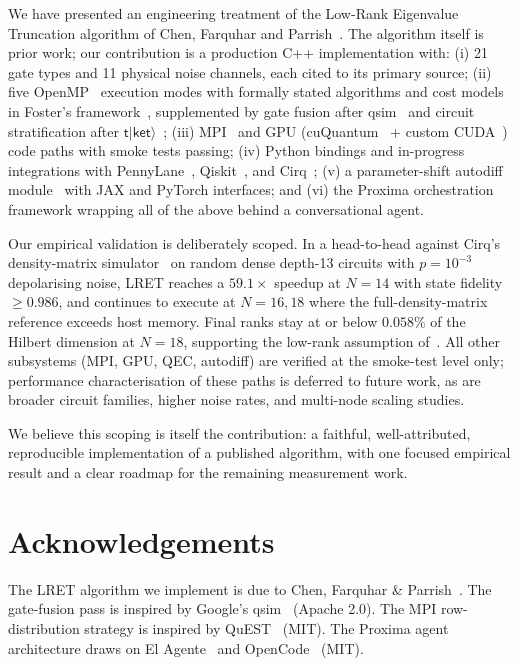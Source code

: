 \documentclass[11pt,a4paper]{article}
\begin{document}
We have presented an engineering treatment of the Low-Rank Eigenvalue Truncation
algorithm of Chen, Farquhar and Parrish~\cite{chen2021lret}. The algorithm itself is
prior work; our contribution is a production C++ implementation with:
(i) 21 gate types and 11 physical noise channels, each cited to its primary source;
(ii) five OpenMP~\cite{dagummenon1998} execution modes with formally stated
algorithms and cost models in Foster's framework~\cite{foster1995}, supplemented by
gate fusion after qsim~\cite{qsim} and circuit stratification after
$\mathsf{t\vert ket\rangle}$~\cite{sivarajah2020tket};
(iii) MPI~\cite{gropp1999mpi} and GPU (cuQuantum~\cite{bayraktar2023cuquantum} +
custom CUDA~\cite{nickolls2008cuda}) code paths with smoke tests passing;
(iv) Python bindings and in-progress integrations with
PennyLane~\cite{bergholm2018pennylane}, Qiskit~\cite{javadi2024qiskit}, and
Cirq~\cite{cirq};
(v) a parameter-shift autodiff module~\cite{mitarai2018,schuld2019} with JAX and
PyTorch interfaces; and
(vi) the Proxima orchestration framework wrapping all of the above behind a
conversational agent.

Our empirical validation is deliberately scoped. In a head-to-head against Cirq's
density-matrix simulator~\cite{cirq} on random dense depth-13 circuits with
$p=10^{-3}$ depolarising noise, LRET reaches a $59.1\times$ speedup at $N=14$ with
state fidelity $\ge 0.986$, and continues to execute at $N=16, 18$ where the
full-density-matrix reference exceeds host memory. Final ranks stay at or below
$0.058\%$ of the Hilbert dimension at $N=18$, supporting the low-rank assumption
of~\cite{chen2021lret}. All other subsystems (MPI, GPU, QEC, autodiff) are verified
at the smoke-test level only; performance characterisation of these paths is
deferred to future work, as are broader circuit families, higher noise rates, and
multi-node scaling studies.

We believe this scoping is itself the contribution: a faithful, well-attributed,
reproducible implementation of a published algorithm, with one focused empirical
result and a clear roadmap for the remaining measurement work.

\section*{Acknowledgements}

The LRET algorithm we implement is due to Chen, Farquhar \& Parrish~\cite{chen2021lret}.
The gate-fusion pass is inspired by Google's qsim~\cite{qsim} (Apache 2.0).
The MPI row-distribution strategy is inspired by QuEST~\cite{jones2019quest} (MIT).
The Proxima agent architecture draws on El Agente~\cite{zou2025elagente} and
OpenCode~\cite{opencode2025} (MIT).
\end{document}
